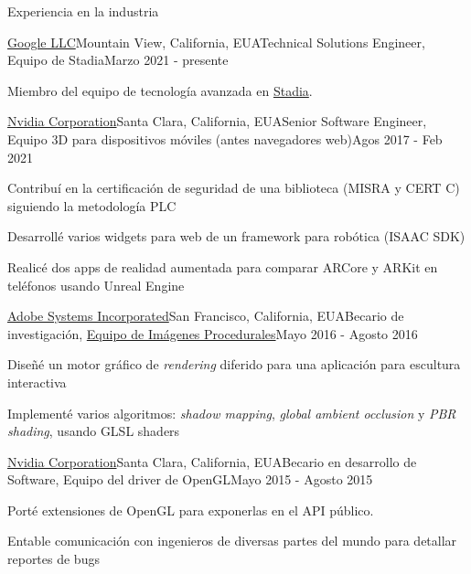 \documentclass{resume} %
\begin{document}

\begin{rSection}{Experiencia en la industria}

\begin{rSubsection}{\href{http://about.google/}{Google LLC}}{Mountain View, California, EUA}{Technical Solutions Engineer, Equipo de Stadia}{Marzo 2021 - presente}
\item Miembro del equipo de tecnología avanzada en \href{http://stadia.google.com/}{Stadia}.
\end{rSubsection}

\begin{rSubsection}{\href{http://www.nvidia.com}{Nvidia Corporation}}{Santa Clara, California, EUA}{Senior Software Engineer, Equipo 3D para dispositivos móviles (antes navegadores web)}{Agos 2017 - Feb 2021}
\item Contribuí en la certificación de seguridad de una biblioteca (MISRA y CERT C) siguiendo la metodología PLC
\item Desarrollé varios widgets para web de un framework para robótica (ISAAC SDK)
\item Realicé dos apps de realidad aumentada para comparar ARCore y ARKit en teléfonos usando Unreal Engine
\end{rSubsection}

\begin{rSubsection}{\href{http://www.adobe.com/}{Adobe Systems Incorporated}}{San Francisco, California, EUA}{Becario de investigación, \href{http://research.adobe.com/}{Equipo de Imágenes Procedurales}}{Mayo 2016 - Agosto 2016}
\item Diseñé un motor gráfico de \emph{rendering} diferido para una aplicación para escultura interactiva
\item Implementé varios algoritmos: \emph{shadow mapping}, \emph{global ambient occlusion} y \emph{PBR shading}, usando GLSL shaders
\end{rSubsection}

\begin{rSubsection}{\href{http://www.nvidia.com}{Nvidia Corporation}}{Santa Clara, California, EUA}{Becario en desarrollo de Software, Equipo del driver de OpenGL}{Mayo 2015 - Agosto 2015}
\item Porté extensiones de OpenGL para exponerlas en el API público.
\item Entable comunicación con ingenieros de diversas partes del mundo para detallar reportes de bugs
\end{rSubsection}


\end{rSection}
\end{document}
